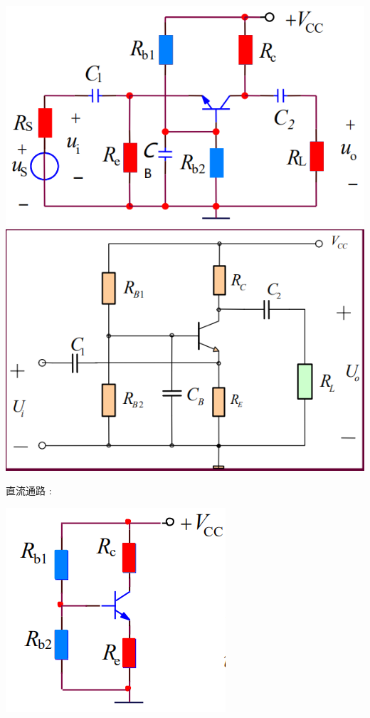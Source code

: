\documentclass[UTF8, 12pt]{ctexart}
\begin{document}
	\includegraphics[scale = 0.4]{02/基本共基放大电路电路图.png}\includegraphics[scale = 0.4]{02/基本共基放大电路电路图(2).png}

	直流通路 :

	\includegraphics[scale = 0.4]{02/基本共基放大电路直流通路.png}
\end{document}
